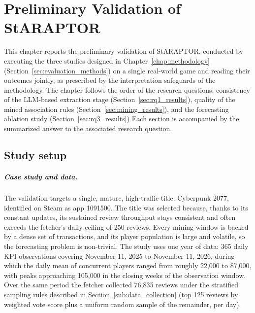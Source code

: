 \chapter{Preliminary Validation of StARAPTOR}
\label{chap:results}

\noindent This chapter reports the preliminary validation of StARAPTOR, conducted by executing the three studies designed in Chapter~\ref{chap:methodology} (Section~\ref{sec:evaluation_methods}) on a single real-world game and reading their outcomes jointly, as prescribed by the interpretation safeguards of the methodology. The chapter follows the order of the research questions: consistency of the LLM-based extraction stage (Section~\ref{sec:rq1_results}), quality of the mined association rules (Section~\ref{sec:mining_results}), and the forecasting ablation study (Section~\ref{sec:rq3_results}) Each section is accompanied by the summarized answer to the associated research question.

\section{Study setup}
\label{sec:study_setup}

\paragraph{Case study and data.} The validation targets a single, mature, high-traffic title: Cyberpunk 2077, identified on Steam as app 1091500. The title was selected because, thanks to its constant updates, its sustained review throughput stays consistent and often exceeds the fetcher's daily ceiling of 250 reviews. Every mining window is backed by a dense set of transactions, and its player population is large and volatile, so the forecasting problem is non-trivial. The study uses one year of data: 365 daily KPI observations covering November 11, 2025 to November 11, 2026, during which the daily mean of concurrent players ranged from roughly 22{,}000 to 87{,}000, with peaks approaching 105{,}000 in the closing weeks of the observation window. Over the same period the fetcher collected 76{,}835 reviews under the stratified sampling rules described in Section~\ref{sub:data_collection} (top 125 reviews by weighted vote score plus a uniform random sample of the remainder, per day).

